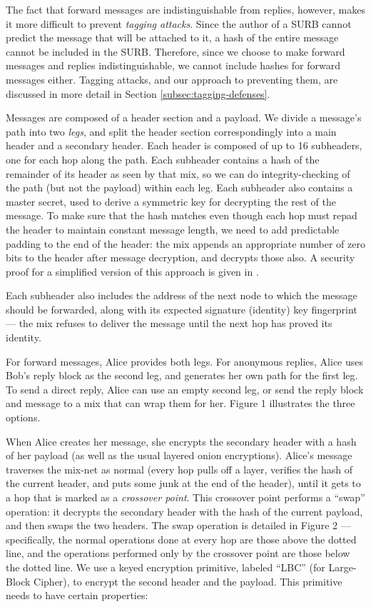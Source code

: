 \documentclass[times,10pt,twocolumn]{article}
\begin{document}
The fact that forward messages are indistinguishable from replies,
however, makes it more difficult to prevent \emph{tagging attacks}.
Since the author of a SURB cannot predict the message that will be
attached to it, a hash of the entire message cannot be included in
the SURB.
Therefore, since we choose to make forward messages and replies
indistinguishable, we cannot include hashes for forward messages either.
Tagging attacks, and our approach to preventing them, are discussed in more
detail in Section \ref{subsec:tagging-defenses}.

Messages are composed of a header section and a payload. We divide
a message's path into two \emph{legs}, and split the header section
correspondingly into a main header and a secondary header. Each header
is composed of up to 16 subheaders, one for each hop along the path.
Each subheader contains a hash of the remainder of its header as seen
by that mix, so we can do integrity-checking of the path (but not the
payload) within each leg. Each subheader also contains a master secret,
used to derive a symmetric key for decrypting the rest of the
message. To make sure that the hash matches even though each hop
must repad the header to maintain constant message length, we need to
add predictable padding to the end of the header: the mix appends an
appropriate number of zero bits to the header after message decryption,
and decrypts those also. A security proof for a simplified version of
this approach is given in \cite{BM:mixencrypt}.

Each subheader also includes the address of the next node to which
the message should be forwarded, along with its expected signature
(identity) key
fingerprint --- the mix refuses to deliver the message until the next
hop has proved its identity.

For forward messages, Alice provides both legs. For anonymous replies, Alice
uses Bob's reply block as the second leg, and generates her own path
for the first leg.  To send a direct reply, Alice can use an empty
second leg, or send the reply block and message to a mix that can wrap
them for her. Figure 1 illustrates the three options.

When Alice creates her message, she encrypts the secondary header with a hash
of her payload (as well as the usual layered onion encryptions). Alice's
message traverses the mix-net as normal (every hop pulls off a layer,
verifies the hash of the current header, and puts some junk at the end of the
header), until it gets to a hop that is marked as a \emph{crossover
  point}. This crossover point performs a ``swap'' operation: it decrypts the
secondary header with the hash of the current payload, and then swaps the two
headers. The swap operation is detailed in Figure 2 --- specifically, the
normal operations done at every hop are those above the dotted line, and the
operations performed only by the crossover point are those below the dotted
line.  We use a keyed encryption primitive, labeled ``LBC'' (for Large-Block
Cipher), to encrypt the second header and the payload.  This primitive needs
to have certain properties:
\end{document}
